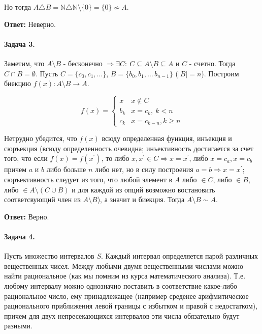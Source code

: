 \documentclass{article}
\newcommand{\pr}{^{\prime}}
\newcommand{\andi}{$ и $}
\newcommand{\N}{\mathbb{N}}
\begin{document}
    Но тогда $A \triangle B = \N \triangle \N \setminus \{0\} = \{0\} \nsim A$.
    
    \textbf{Ответ:} Неверно.

    \paragraph{Задача 3.}
    Заметим, что $A \setminus B$ - бесконечно 
    $\Rightarrow \exists C:\ C \subseteq A \setminus B \subseteq A$ и $C$ - счетно. Тогда 
    $C \cap B = \emptyset$. Пусть $C = \{c_0, c_1, \ldots\}$, $B = \{b_0, b_1, \ldots\, b_{n - 1}\}$ ($|B| = n$). Построим биекцию $f(x): A \setminus B \rightarrow  A$.

    \begin{equation*}
        f(x) = 
         \begin{cases}
           x &\text{$x \notin C$}\\
           b_{k} &\text{$x = c_{k},\ k < n $}\\
           c_{k} &\text{$x = c_{k - n}, k \ge n$}
         \end{cases}
    \end{equation*}

    Нетрудно убедится, что $f(x)$ всюду определенная функция, инъекция и сюръекция 
    (всюду определенность очевидна; 
    инъективность достигается за счет того, что если $f(x) = f(x\pr)$, то либо $x, x\pr \in C \Rightarrow x = x\pr$, либо $x = c_{a}, x = c_{b}$ причем $a \andi b$ либо больше $n$ либо нет, но в силу построения $a = b \Rightarrow x = x\pr$;
    сюръективность следует из того, что любой элемент в $A$ либо $\in C$, либо $\in B$, либо $\in A \setminus (C \cup B)$ и для каждой из опций возможно востановить соответсвующий член из $A \setminus B$), 
    а значит и биекция. Тогда $A \setminus B \sim A$.

    \textbf{Ответ:} Верно.

    \paragraph{Задача 4.}
    Пусть множество интервалов $S$. Каждый интервал определяется парой различных вещественных чисел. 
    Между любыми двумя вещественными числами можно найти рациональное (как мы помним из курса математического анализа). Т.е. любому интервалу можно однозначно поставить в соответствие какое-либо рациональное число, ему принадлежащее (например среденее арифмитическое рационального приближения левой границы с избытком и правой с недостатком), причем для двух непресекающихся интервалов эти числа обязательно будут разными.
\end{document}
